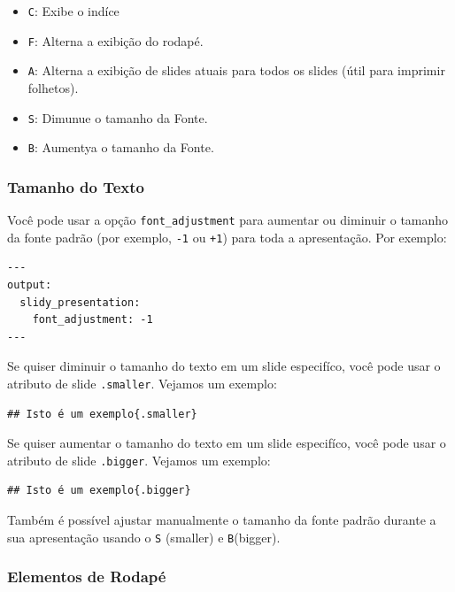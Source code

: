 \documentclass[
]{book}
\providecommand{\tightlist}{%
  \setlength{\itemsep}{0pt}\setlength{\parskip}{0pt}}
\begin{document}
\begin{itemize}
\tightlist
\item
  \texttt{\textquotesingle{}C\textquotesingle{}}: Exibe o indíce
\item
  \texttt{\textquotesingle{}F\textquotesingle{}}: Alterna a exibição do rodapé.
\item
  \texttt{\textquotesingle{}A\textquotesingle{}}: Alterna a exibição de slides atuais para todos os slides (útil para imprimir folhetos).
\item
  \texttt{\textquotesingle{}S\textquotesingle{}}: Dimunue o tamanho da Fonte.
\item
  \texttt{\textquotesingle{}B\textquotesingle{}}: Aumentya o tamanho da Fonte.
\end{itemize}

\hypertarget{tamanho-do-texto}{%
\subsubsection*{Tamanho do Texto}\label{tamanho-do-texto}}

Você pode usar a opção \texttt{font\_adjustment} para aumentar ou diminuir o tamanho da fonte padrão (por exemplo, \texttt{-1} ou \texttt{+1}) para toda a apresentação. Por exemplo:

\begin{verbatim}
---
output:
  slidy_presentation:
    font_adjustment: -1
---
\end{verbatim}

Se quiser diminuir o tamanho do texto em um slide especifíco, você pode usar o atributo de slide \texttt{.smaller}. Vejamos um exemplo:

\begin{verbatim}
## Isto é um exemplo{.smaller}
\end{verbatim}

Se quiser aumentar o tamanho do texto em um slide especifíco, você pode usar o atributo de slide \texttt{.bigger}. Vejamos um exemplo:

\begin{verbatim}
## Isto é um exemplo{.bigger}
\end{verbatim}

Também é possível ajustar manualmente o tamanho da fonte padrão durante a sua apresentação usando o \texttt{\textquotesingle{}S\textquotesingle{}} (smaller) e \texttt{B}(bigger).

\hypertarget{elementos-de-rodapuxe9}{%
\subsubsection*{Elementos de Rodapé}\label{elementos-de-rodapuxe9}}
\end{document}

